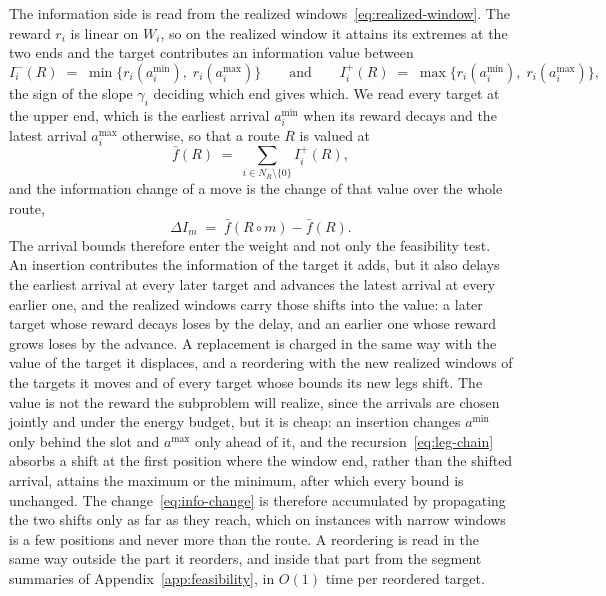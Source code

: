 \documentclass[11pt]{article}
\begin{document}
The information side is read from the realized windows~\eqref{eq:realized-window}. The reward $r_i$ is linear on $W_i$, so on the realized window it attains its extremes at the two ends and the target contributes an information value between
\begin{equation}\label{eq:info-bounds}
    I^-_i(R) \;=\; \min\bigl\{ r_i(a^{\min}_i),\; r_i(a^{\max}_i) \bigr\}
    \qquad \text{and} \qquad
    I^+_i(R) \;=\; \max\bigl\{ r_i(a^{\min}_i),\; r_i(a^{\max}_i) \bigr\} ,
\end{equation}
the sign of the slope $\gamma_i$ deciding which end gives which. We read every target at the upper end, which is the earliest arrival $a^{\min}_i$ when its reward decays and the latest arrival $a^{\max}_i$ otherwise, so that a route $R$ is valued at
\begin{equation}\label{eq:info-bound}
    \bar{f}(R) \;=\; \sum_{i \in N_R \setminus \{0\}} I^{+}_i(R),
\end{equation}
and the information change of a move is the change of that value over the whole route,
\begin{equation}\label{eq:info-change}
    \Delta I_m \;=\; \bar{f}(R \circ m) - \bar{f}(R) .
\end{equation}
The arrival bounds therefore enter the weight and not only the feasibility test. An insertion contributes the information of the target it adds, but it also delays the earliest arrival at every later target and advances the latest arrival at every earlier one, and the realized windows carry those shifts into the value: a later target whose reward decays loses by the delay, and an earlier one whose reward grows loses by the advance. A replacement is charged in the same way with the value of the target it displaces, and a reordering with the new realized windows of the targets it moves and of every target whose bounds its new legs shift. The value is not the reward the subproblem will realize, since the arrivals are chosen jointly and under the energy budget, but it is cheap: an insertion changes $a^{\min}$ only behind the slot and $a^{\max}$ only ahead of it, and the recursion~\eqref{eq:leg-chain} absorbs a shift at the first position where the window end, rather than the shifted arrival, attains the maximum or the minimum, after which every bound is unchanged. The change~\eqref{eq:info-change} is therefore accumulated by propagating the two shifts only as far as they reach, which on instances with narrow windows is a few positions and never more than the route. A reordering is read in the same way outside the part it reorders, and inside that part from the segment summaries of Appendix~\ref{app:feasibility}, in $O(1)$ time per reordered target.
\end{document}
